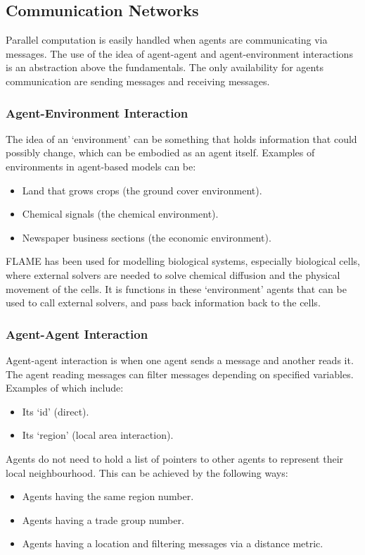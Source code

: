 \documentclass[a4paper,11pt]{article}
\begin{document}
\subsection{Communication Networks}
Parallel computation is easily handled when agents are communicating
via messages. The use of the idea of agent-agent and
agent-environment interactions is an abstraction above the
fundamentals. The only availability for agents communication are sending messages
and receiving messages.

\subsubsection{Agent-Environment Interaction}
The idea of an `environment' can be something that holds information
that could possibly change, which can be embodied as an agent
itself. Examples of environments in agent-based models can be:

\begin{itemize}
\item Land that grows crops (the ground cover environment).
\item Chemical signals (the chemical environment).
\item Newspaper business sections (the economic environment).
\end{itemize}

FLAME has been used for modelling biological systems, especially biological cells, 
where external solvers are needed to solve chemical diffusion and the physical movement of the cells.
It is functions in these `environment' agents that can be used to call external solvers, and pass back
information back to the cells.

\subsubsection{Agent-Agent Interaction}
Agent-agent interaction is when one agent sends a message and
another reads it. The agent reading messages can filter
messages depending on specified variables. Examples of which
include:
\begin{itemize}
\item Its `id' (direct).
\item Its `region' (local area interaction).
\end{itemize}

Agents do not need to hold a list of pointers to other agents to
represent their local neighbourhood. This can be achieved by the
following ways:
\begin{itemize}
\item Agents having the same region number.
\item Agents having a trade group number.
\item Agents having a location and filtering messages via a distance
metric.
\end{itemize}
\end{document}
